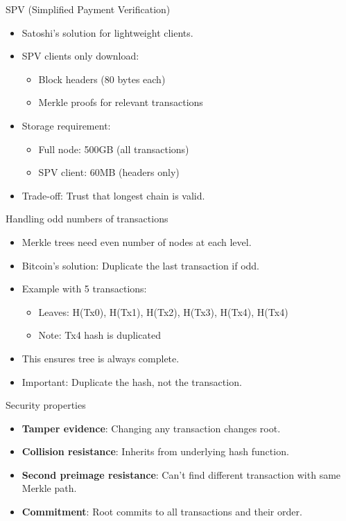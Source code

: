 \documentclass[aspectratio=169, lualatex, handout]{beamer}
\begin{document}
\begin{frame}{SPV (Simplified Payment Verification)}
	\begin{itemize}
		\item Satoshi's solution for lightweight clients.
		\item SPV clients only download:
		      \begin{itemize}
			      \item Block headers (80 bytes each)
			      \item Merkle proofs for relevant transactions
		      \end{itemize}
		\item Storage requirement:
		      \begin{itemize}
			      \item Full node: \approx500GB (all transactions)
			      \item SPV client: \approx60MB (headers only)
		      \end{itemize}
		\item Trade-off: Trust that longest chain is valid.
	\end{itemize}
\end{frame}

\begin{frame}{Handling odd numbers of transactions}
	\begin{itemize}
		\item Merkle trees need even number of nodes at each level.
		\item Bitcoin's solution: Duplicate the last transaction if odd.
		\item Example with 5 transactions:
		      \begin{itemize}
			      \item Leaves: H(Tx0), H(Tx1), H(Tx2), H(Tx3), H(Tx4), H(Tx4)
			      \item Note: Tx4 hash is duplicated
		      \end{itemize}
		\item This ensures tree is always complete.
		\item Important: Duplicate the hash, not the transaction.
	\end{itemize}
\end{frame}

\begin{frame}{Security properties}
	\begin{itemize}
		\item \textbf{Tamper evidence}: Changing any transaction changes root.
		\item \textbf{Collision resistance}: Inherits from underlying hash function.
		\item \textbf{Second preimage resistance}: Can't find different transaction with same Merkle path.
		\item \textbf{Commitment}: Root commits to all transactions and their order.
	\end{itemize}
\end{frame}
\end{document}
